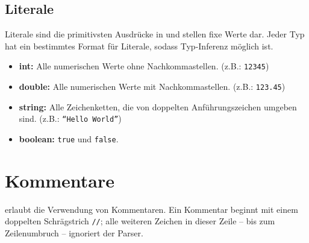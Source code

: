 \subsection{Literale}

Literale sind die primitivsten Ausdrücke in \toya und stellen fixe Werte dar. Jeder Typ hat ein bestimmtes Format für Literale, sodass Typ-Inferenz möglich ist. 

\begin{itemize}
    \item \textbf{int:} Alle numerischen Werte ohne Nachkommastellen. (z.B.: \texttt{12345})
    \item \textbf{double:} Alle numerischen Werte mit Nachkommastellen. (z.B.: \texttt{123.45})
    \item \textbf{string:} Alle Zeichenketten, die von doppelten Anführungszeichen umgeben sind. (z.B.: \texttt{``Hello World''})
    \item \textbf{boolean:} \texttt{true} und \texttt{false}. 
\end{itemize}

\section{Kommentare}

\toya erlaubt die Verwendung von Kommentaren. Ein Kommentar beginnt mit einem doppelten Schrägstrich \texttt{//}; alle weiteren Zeichen in dieser Zeile -- bis zum Zeilenumbruch -- ignoriert der Parser.